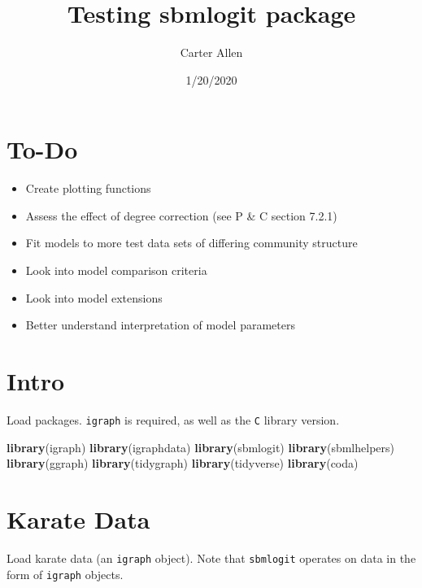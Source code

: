 \documentclass[]{article}
\title{Testing sbmlogit package}
\author{Carter Allen}
\date{1/20/2020}
\newenvironment{Shaded}{\begin{snugshade}}{\end{snugshade}}
\newcommand{\KeywordTok}[1]{\textcolor[rgb]{0.13,0.29,0.53}{\textbf{#1}}}
\newcommand{\NormalTok}[1]{#1}
\providecommand{\tightlist}{%
  \setlength{\itemsep}{0pt}\setlength{\parskip}{0pt}}
\begin{document}
\maketitle

{
\setcounter{tocdepth}{2}
\tableofcontents
}
\hypertarget{to-do}{%
\section{To-Do}\label{to-do}}

\begin{itemize}
\tightlist
\item
  Create plotting functions
\item
  Assess the effect of degree correction (see P \& C section 7.2.1)
\item
  Fit models to more test data sets of differing community structure
\item
  Look into model comparison criteria
\item
  Look into model extensions
\item
  Better understand interpretation of model parameters
\end{itemize}

\hypertarget{intro}{%
\section{Intro}\label{intro}}

Load packages. \texttt{igraph} is required, as well as the \texttt{C}
library version.

\begin{Shaded}
\begin{Highlighting}[]
\KeywordTok{library}\NormalTok{(igraph)}
\KeywordTok{library}\NormalTok{(igraphdata)}
\KeywordTok{library}\NormalTok{(sbmlogit)}
\KeywordTok{library}\NormalTok{(sbmlhelpers)}
\KeywordTok{library}\NormalTok{(ggraph)}
\KeywordTok{library}\NormalTok{(tidygraph)}
\KeywordTok{library}\NormalTok{(tidyverse)}
\KeywordTok{library}\NormalTok{(coda)}
\end{Highlighting}
\end{Shaded}

\hypertarget{karate-data}{%
\section{Karate Data}\label{karate-data}}

Load karate data (an \texttt{igraph} object). Note that
\texttt{sbmlogit} operates on data in the form of \texttt{igraph}
objects.
\end{document}
